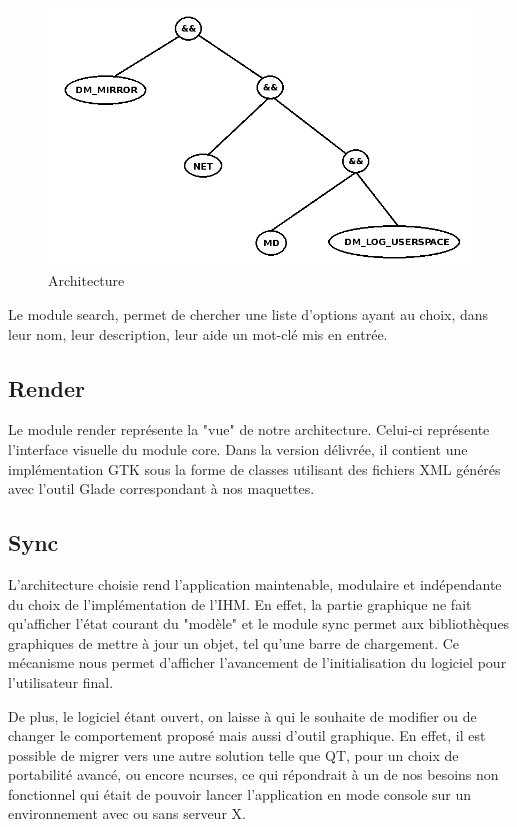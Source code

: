 \documentclass[16pts]{report}
\begin{document}
    \begin{figure}[H]
        \includegraphics[scale=0.5]{illustrations/condition_tree.png}
        \centering
        \caption{Architecture}
        \label{fig:Arch}
    \end{figure}

    Le module search, permet de chercher une liste d'options ayant au choix,
    dans leur nom, leur description, leur aide un mot-clé mis en entrée.

    \subsection{Render}
    \label{sub:Render}
    Le module render représente la "vue" de notre architecture.
    Celui-ci représente l'interface visuelle du module core.
    Dans la version délivrée, il contient une implémentation GTK sous la forme
    de classes utilisant des fichiers XML générés avec l'outil Glade
    correspondant à nos maquettes.

    \subsection{Sync}
    \label{sub:Sync}
    L'architecture choisie rend l'application maintenable, modulaire et
    indépendante du choix de l'implémentation de l'IHM. En effet, la partie
    graphique ne fait qu'afficher l'état courant du "modèle" et le module
    sync permet aux bibliothèques graphiques de mettre à jour un objet, tel
    qu'une barre de chargement. Ce mécanisme nous permet d'afficher
    l'avancement de l'initialisation du logiciel pour l'utilisateur final.

    De plus, le logiciel étant ouvert, on laisse à qui le souhaite de modifier
    ou de changer le comportement proposé mais aussi d'outil graphique.
    En effet, il est possible de migrer vers une autre solution telle que QT,
    pour un choix de portabilité avancé,  ou encore ncurses, ce qui répondrait
    à un de nos besoins non fonctionnel qui était de pouvoir lancer
    l'application en mode console sur un environnement avec ou sans serveur X.
\end{document}
